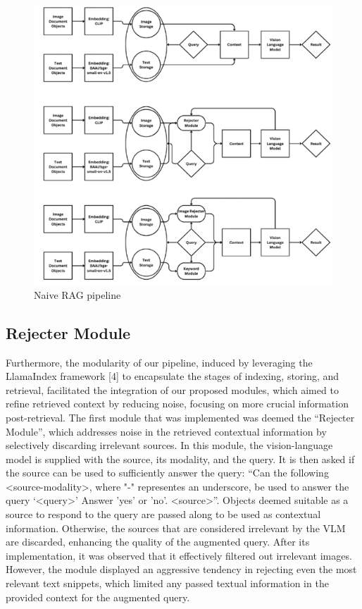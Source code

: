 \documentclass[twocolumn]{article}
\begin{document}
\begin{figure}
    \centering
    \includegraphics[width=1\linewidth]{image.png}
    \caption{Naive RAG pipeline}
    \label{fig:enter-label}
\end{figure}

\subsection{Rejecter Module}
Furthermore, the modularity of our pipeline, induced by leveraging the LlamaIndex framework [4] to encapsulate the stages of indexing, storing, and retrieval, facilitated the integration of our proposed modules, which aimed to refine retrieved context by reducing noise, focusing on more crucial information post-retrieval.
The first module that was implemented was deemed the “Rejecter Module”, which addresses noise in the retrieved contextual information by selectively discarding irrelevant sources. In this module, the vision-language model is supplied with the source, its modality, and the query. It is then asked if the source can be used to sufficiently answer the query: “Can the following <source-modality>, where "-" representes an underscore, be used to answer the query ‘<query>’ Answer 'yes' or 'no'. <source>”. Objects deemed suitable as a source to respond to the query are passed along to be used as contextual information. Otherwise, the sources that are considered irrelevant by the VLM are discarded, enhancing the quality of the augmented query.
After its implementation, it was observed that it effectively filtered out irrelevant images. However, the module displayed an aggressive tendency in rejecting even the most relevant text snippets, which limited any passed textual information in the provided context for the augmented query.
\end{document}
